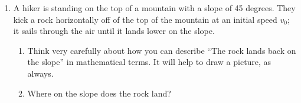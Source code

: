 \documentclass[12pt]{article}
\begin{document}
\begin{enumerate}
%
%
%
%
%
%
%
%

\item A hiker is standing on the top of a mountain with a slope of 45 degrees. They kick a rock horizontally off of the top of the mountain at an initial speed $v_0$; it sails through the air until it lands 
	lower on the slope.

	\begin{enumerate}
		\item Think very carefully about how you can describe ``The rock lands back on the slope'' in mathematical terms. It will help to draw a picture, as always.
		\item Where on the slope does the rock land?
	\end{enumerate}

\end{enumerate}
\end{document}
